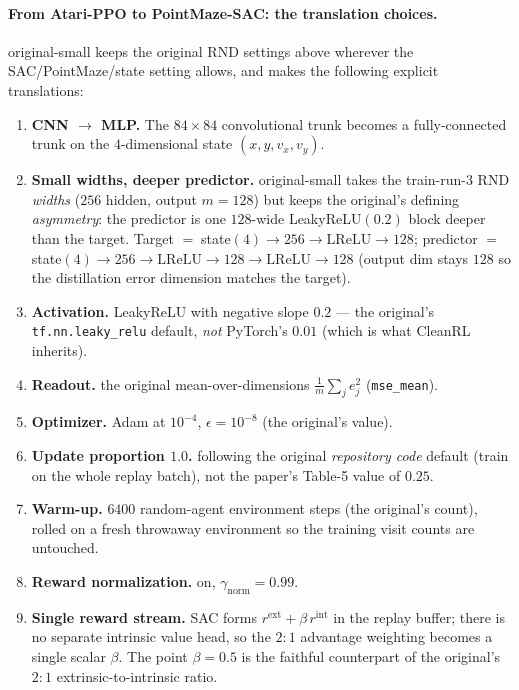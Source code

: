 \paragraph{From Atari-PPO to PointMaze-SAC: the translation choices.}
original-small keeps the original RND settings above wherever the SAC/PointMaze/state setting allows,
and makes the following explicit translations:
\begin{enumerate}[label=(\roman*),leftmargin=*]
\item \textbf{CNN $\to$ MLP.} The $84\times84$ convolutional trunk becomes a fully-connected trunk
  on the $4$-dimensional state $(x,y,v_x,v_y)$.
\item \textbf{Small widths, deeper predictor.} original-small takes the train-run-3 RND \emph{widths}
  ($256$ hidden, output $m{=}128$) but keeps the original's defining \emph{asymmetry}: the predictor
  is one $128$-wide LeakyReLU$(0.2)$ block deeper than the target. Target
  $=\;$state$(4)\!\to\!256\!\to\!\mathrm{LReLU}\!\to\!128$; predictor
  $=\;$state$(4)\!\to\!256\!\to\!\mathrm{LReLU}\!\to\!128\!\to\!\mathrm{LReLU}\!\to\!128$ (output
  dim stays $128$ so the distillation error dimension matches the target).
\item \textbf{Activation.} LeakyReLU with negative slope $0.2$ --- the original's
  \texttt{tf.nn.\allowbreak leaky\_\allowbreak relu} default, \emph{not} PyTorch's $0.01$ (which is
  what CleanRL inherits).
\item \textbf{Readout.} the original mean-over-dimensions $\tfrac1m\sum_j e_j^2$
  (\texttt{mse\_\allowbreak mean}).
\item \textbf{Optimizer.} Adam at $10^{-4}$, $\epsilon{=}10^{-8}$ (the original's value).
\item \textbf{Update proportion $1.0$.} following the original \emph{repository code} default (train
  on the whole replay batch), not the paper's Table-5 value of $0.25$.
\item \textbf{Warm-up.} $6400$ random-agent environment steps (the original's count), rolled on a
  fresh throwaway environment so the training visit counts are untouched.
\item \textbf{Reward normalization.} on, $\gamma_{\mathrm{norm}}{=}0.99$.
\item \textbf{Single reward stream.} SAC forms $r^{\mathrm{ext}}+\beta\,r^{\mathrm{int}}$ in the
  replay buffer; there is no separate intrinsic value head, so the $2\!:\!1$ advantage weighting
  becomes a single scalar $\beta$. The point $\beta{=}0.5$ is the faithful counterpart of the
  original's $2\!:\!1$ extrinsic-to-intrinsic ratio.
\end{enumerate}

